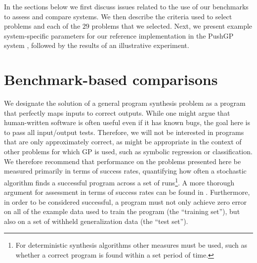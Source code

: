\documentclass{sig-alternate}
\begin{document}
In the sections below we first discuss issues related to the use of our benchmarks to assess and compare systems. We then describe the criteria used to select problems and each of the $29$ problems that we selected. Next, we present example system-specific parameters for our reference implementation in the PushGP system \cite{spector:2002:GPEM, 1068292}, followed by the results of an illustrative experiment.




\section{Benchmark-based comparisons}


We designate the solution of a general program synthesis problem as a program that perfectly maps inputs to correct outputs. While one might argue that human-written software is often useful even if it has known bugs, the goal here is to pass all input/output tests. Therefore, we will not be interested in programs that are only approximately correct, as might be appropriate in the context of other problems for which GP is used, such as symbolic regression or classification. We therefore recommend that performance on the problems presented here be measured primarily in terms of success rates, quantifying how often a stochastic algorithm finds a successful program across a set of runs\footnote{For deterministic synthesis algorithms other measures must be used, such as whether a correct program is found within a set period of time.}. A more thorough argument for assessment in terms of success rates can be found in \cite{Helmuth:2014:GECCO}.
Furthermore, in order to be considered successful, a program must not only achieve zero error on all of the example data used to train the program (the ``training set''), but also on a set of withheld generalization data (the ``test set''). 
\end{document}
